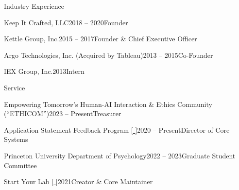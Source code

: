 \documentclass{cv} %
\begin{document}

\begin{cvSection}{Industry Experience}

\begin{cvSubsectionWork}{Keep It Crafted, LLC}{2018 -- 2020}{Founder}
\end{cvSubsectionWork}

\begin{cvSubsectionWork}{Kettle Group, Inc.}{2015 -- 2017}{Founder \& Chief Executive Officer}
\end{cvSubsectionWork}

\begin{cvSubsectionWork}{Argo Technologies, Inc. (Acquired by Tableau)}{2013 -- 2015}{Co-Founder}
\end{cvSubsectionWork}

\begin{cvSubsectionWork}{IEX Group, Inc.}{2013}{Intern}
\end{cvSubsectionWork}

\end{cvSection}


\begin{cvSection}{Service}

\begin{cvSubsectionWork}{Empowering Tomorrow's Human-AI Interaction \& Ethics Community (``ETHICOM'')}{2023 -- Present}{Treasurer}
\end{cvSubsectionWork}

\begin{cvSubsectionWork}{Application Statement Feedback Program [\href{https://www.asfp.io/}{ }]}{2020 -- Present}{Director of Core Systems}
\end{cvSubsectionWork}

\begin{cvSubsectionWork}{Princeton University Department of Psychology}{2022 -- 2023}{Graduate Student Committee}
\end{cvSubsectionWork}

\begin{cvSubsectionWork}{Start Your Lab [\href{https://www.startyourlab.com/}{ }]}{2021}{Creator \& Core Maintainer}
\end{cvSubsectionWork}

\end{cvSection}
\end{document}

